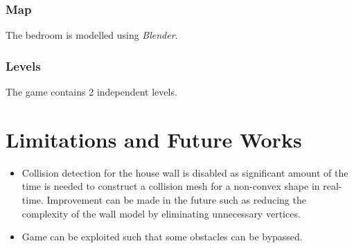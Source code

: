 \documentclass[12pt, a4paper, oneside]{article}
\begin{document}
    \subsubsection{Map}

    The bedroom is modelled using \textit{Blender}.

    \subsubsection{Levels}

    The game contains 2 independent levels.
    
    \section{Limitations and Future Works}

    \begin{itemize}[label=\(\diamond\)]
        \item Collision detection for the house wall is disabled as significant amount of the time is needed to construct a collision mesh for a non-convex shape in real-time. Improvement can be made in the future such as reducing the complexity of the wall model by eliminating unnecessary vertices.
        \item Game can be exploited such that some obstacles can be bypassed.
    \end{itemize}

    
    
\end{document}
